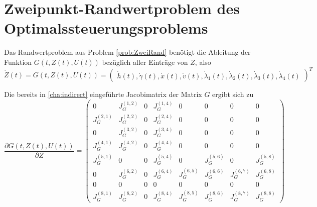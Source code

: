 \chapter{Zweipunkt-Randwertproblem des Optimalssteuerungsproblems} \label{Anhang:Jacobi}
Das Randwertproblem aus Problem \ref{prob:ZweiRand} benötigt die Ableitung der Funktion \(G(t, Z(t), U(t))\) bezüglich aller Einträge von \(Z\), also
\begin{equation} 
    \dot{Z}(t) = G(t,Z(t),U(t)) = 
    \begin{pmatrix}
        \dot{h}(t),\dot{\gamma}(t),\dot{x}(t),\dot{v}(t),\dot{\lambda}_1(t),\dot{\lambda}_2(t),\dot{\lambda}_3(t),\dot{\lambda}_4(t)
    \end{pmatrix}^T
\end{equation}

Die bereits in \autoref{cha:indirect} eingeführte Jacobimatrix der Matrix \(G\) ergibt sich zu
\begin{equation} \label{equ:jacobi}
    \dfrac{\partial G(t,Z(t),U(t))}{\partial Z} = 
    \begin{pmatrix}
        0 & J_G^{(1,2)} & 0 & J_G^{(1,4)} & 0 & 0 & 0 & 0 \\ 
        J_G^{(2,1)} & J_G^{(2,2)} & 0 & J_G^{(2,4)} & 0 & 0 & 0 & 0 \\ 
        0 & J_G^{(3,2)} & 0 & J_G^{(3,4)} & 0 & 0 & 0 & 0 \\ 
        J_G^{(4,1)} & J_G^{(4,2)} & 0 & J_G^{(4,4)} & 0 & 0 & 0 & 0 \\
        J_G^{(5,1)} & 0 & 0 & J_G^{(5,4)} & 0 & J_G^{(5,6)} & 0 & J_G^{(5,8)} \\
        0 & J_G^{(6,2)} & 0 & J_G^{(6,4)} & J_G^{(6,5)} & J_G^{(6,6)} & J_G^{(6,7)} & J_G^{(6,8)} \\
        0 & 0 & 0 & 0 & 0 & 0 & 0 & 0 \\
        J_G^{(8,1)} & J_G^{(8,2)} & 0 & J_G^{(8,4)} & J_G^{(8,5)} & J_G^{(8,6)} & J_G^{(8,7)} & J_G^{(8,8)}
    \end{pmatrix}
\end{equation}

